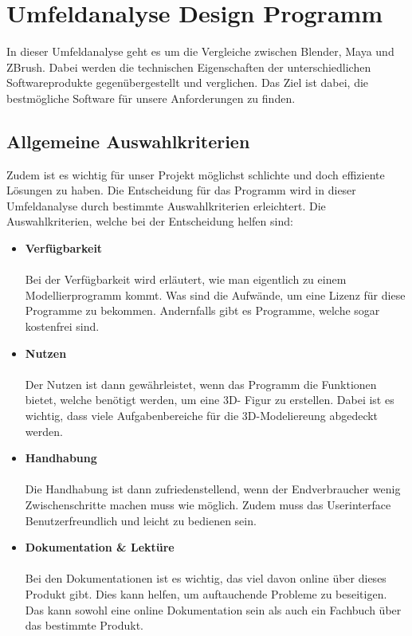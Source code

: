 
\section{Umfeldanalyse Design Programm}
In dieser Umfeldanalyse geht es um die Vergleiche zwischen Blender, Maya und ZBrush. Dabei werden die technischen Eigenschaften der unterschiedlichen Softwareprodukte gegenübergestellt und verglichen. Das Ziel ist dabei, die bestmögliche Software für unsere Anforderungen zu finden.


\subsection{Allgemeine Auswahlkriterien}
Zudem ist es wichtig für unser Projekt möglichst schlichte und doch effiziente Lösungen zu haben. Die Entscheidung für das Programm wird in dieser Umfeldanalyse durch bestimmte Auswahlkriterien erleichtert. Die Auswahlkriterien, welche bei der Entscheidung helfen sind: 

\begin{itemize}
    \item \textbf{Verfügbarkeit} \\\\ Bei der Verfügbarkeit wird erläutert, wie man eigentlich zu einem Modellierprogramm kommt. Was sind die Aufwände, um eine Lizenz für diese Programme zu bekommen. Andernfalls gibt es Programme, welche sogar kostenfrei sind.
    \item \textbf{Nutzen} \\\\Der Nutzen ist dann gewährleistet, wenn das Programm die Funktionen bietet, welche benötigt werden, um eine 3D- Figur zu erstellen. Dabei ist es wichtig, dass viele Aufgabenbereiche für die 3D-Modeliereung abgedeckt werden.
    \item \textbf{Handhabung} \\\\Die Handhabung ist dann zufriedenstellend, wenn der Endverbraucher wenig Zwischenschritte machen muss wie möglich. Zudem muss das Userinterface Benutzerfreundlich und leicht zu bedienen sein.
    \item \textbf{Dokumentation \& Lektüre} \\\\ Bei den Dokumentationen ist es wichtig, das viel davon online über dieses Produkt gibt. Dies kann helfen, um auftauchende Probleme zu beseitigen. Das kann sowohl eine online Dokumentation sein als auch ein Fachbuch über das bestimmte Produkt.
\end{itemize}




